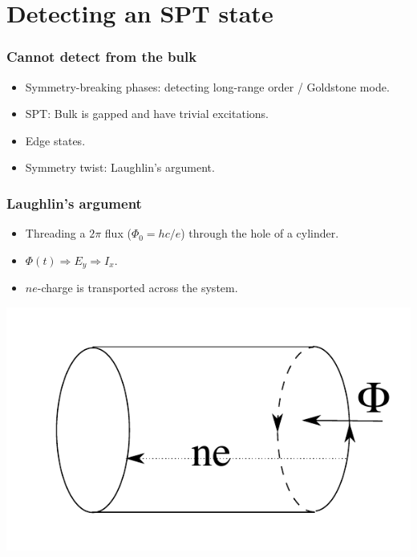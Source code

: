 \documentclass[xcolor=table, aspectratio=169,ignorenonframetext]{beamer}
\begin{document}
\section{Detecting an SPT state}

\begin{frame}
	\frametitle{Cannot detect from the bulk}
	\begin{itemize}
		\item Symmetry-breaking phases: detecting long-range order / Goldstone mode.
		\item SPT: Bulk is gapped and have trivial excitations.
		\item Edge states.
		\item Symmetry twist: Laughlin's argument.
	\end{itemize}
	\begin{center}
	\end{center}
\end{frame}

\begin{frame}
	\frametitle{Laughlin's argument}
	\begin{itemize}
		\item Threading a $2\pi$ flux ($\Phi_0 = hc/e$) through the hole of a cylinder.
		\item $\Phi(t)\Rightarrow E_y\Rightarrow I_x$.
		\item $ne$-charge is transported across the system.
	\end{itemize}
	\includegraphics{laughlin}
\end{frame}
\end{document}
